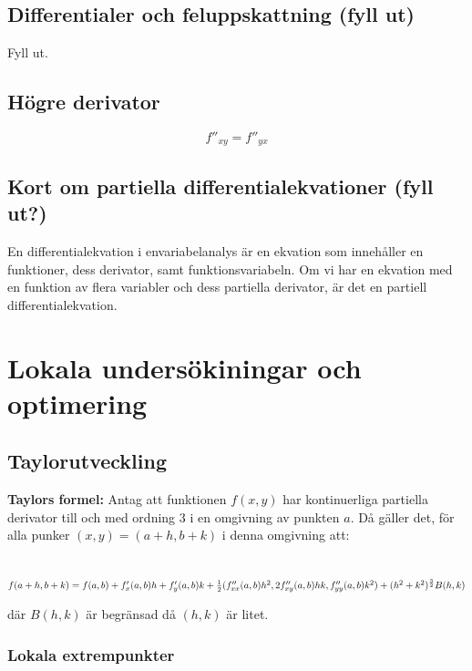 \documentclass[a4paper,12pt]{article}
\begin{document}
\subsection{Differentialer och feluppskattning (fyll ut)}
Fyll ut.

\subsection{Högre derivator}
\[
    f''_{xy} = f''_{yx}
\]

\subsection{Kort om partiella differentialekvationer (fyll ut?)}
En differentialekvation i envariabelanalys är en ekvation som innehåller en funktioner, dess derivator, samt funktionsvariabeln.
Om vi har en ekvation med en funktion av flera variabler och dess partiella derivator, är det en partiell differentialekvation.

\section{Lokala undersökiningar och optimering}
\subsection{Taylorutveckling}
\textbf{Taylors formel:} Antag att funktionen $f(x, y)$ har kontinuerliga partiella derivator till och med ordning 3 i en omgivning av punkten $a$.
Då gäller det, för alla punker $(x, y) = (a + h, b + k)$ i denna omgivning att:\\\\
\begin{multiline}
    $f(a + h, b + k) = f(a, b) + f'_x(a, b)h + f'_y(a, b)k + \\
    \frac{1}{2}(f''_{xx}(a, b)h^2, 2f''_{xy}(a, b)hk, f''_{yy}(a, b)k^2) + (h^2 + k^2)^{\frac{3}{2}}B(h, k)$
\end{multiline}
där $B(h,k)$ är begränsad då $(h, k)$ är litet.

\subsubsection{Lokala extrempunkter}
\end{document}
